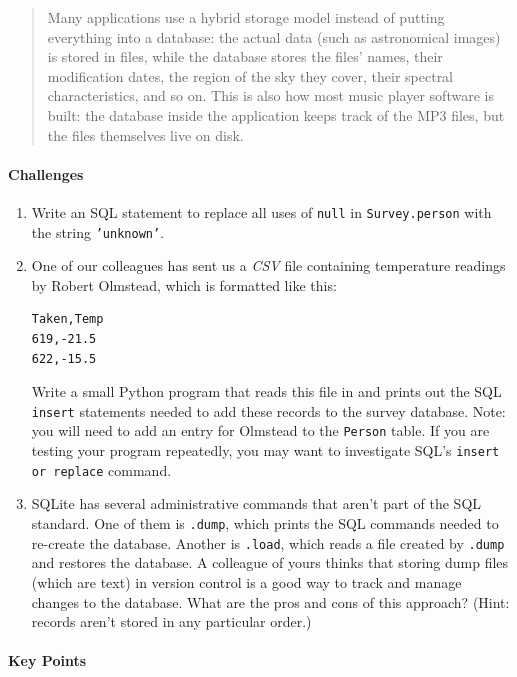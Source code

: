 \documentclass[]{book}
\newcommand{\gdef}[2]{\emph{#2}}
\begin{document}
\begin{quote}
Many applications use a hybrid storage model instead of putting
everything into a database: the actual data (such as astronomical
images) is stored in files, while the database stores the files' names,
their modification dates, the region of the sky they cover, their
spectral characteristics, and so on. This is also how most music player
software is built: the database inside the application keeps track of
the MP3 files, but the files themselves live on disk.
\end{quote}

\mbox{}\paragraph{Challenges}

\begin{enumerate}
\item
  Write an SQL statement to replace all uses of \texttt{null} in
  \texttt{Survey.person} with the string \texttt{'unknown'}.
\item
  One of our colleagues has sent us a \gdef{g:csv}{CSV} file
  containing temperature readings by Robert Olmstead, which is formatted
  like this:

\begin{verbatim}
Taken,Temp
619,-21.5
622,-15.5
\end{verbatim}

  Write a small Python program that reads this file in and prints out
  the SQL \texttt{insert} statements needed to add these records to the
  survey database. Note: you will need to add an entry for Olmstead to
  the \texttt{Person} table. If you are testing your program repeatedly,
  you may want to investigate SQL's \texttt{insert or replace} command.
\item
  SQLite has several administrative commands that aren't part of the SQL
  standard. One of them is \texttt{.dump}, which prints the SQL commands
  needed to re-create the database. Another is \texttt{.load}, which
  reads a file created by \texttt{.dump} and restores the database. A
  colleague of yours thinks that storing dump files (which are text) in
  version control is a good way to track and manage changes to the
  database. What are the pros and cons of this approach? (Hint: records
  aren't stored in any particular order.)
\end{enumerate}

\mbox{}\paragraph{Key Points}
\end{document}
